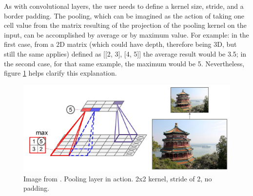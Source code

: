 \documentclass[../main.tex]{subfiles}
\begin{document}
As with convolutional layers, the user needs to define a kernel size, stride, and a border padding. The pooling, which can be imagined as the action of taking one cell value from the matrix resulting of the projection of the pooling kernel on the input, can be accomplished by average or by maximum value. For example: in the first case, from a 2D matrix (which could have depth, therefore being 3D, but still the same applies) defined as [[2, 3], [4, 5]] the average result would be 3.5; in the second case, for that same example, the maximum would be 5. Nevertheless, figure \ref{fig:pooling_example} helps clarify this explanation.

\begin{figure}[H]
    \centering
    \includegraphics[width=0.8\linewidth]{images/pooling_example.JPG}
    \caption{Image from \cite{hands_on_ML_Aurelien}. Pooling layer in action. 2x2 kernel, stride of 2, no padding.}
    \label{fig:pooling_example}
\end{figure}
\end{document}
